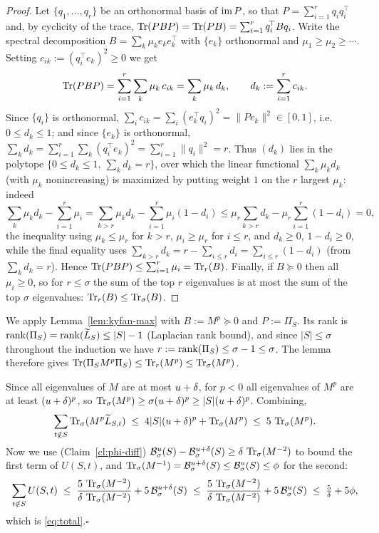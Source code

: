 \begin{proof}
Let $\{q_1,\dots,q_r\}$ be an orthonormal basis of $\operatorname{im} P$, so that
$P=\sum_{i=1}^r q_iq_i^{\!\top}$ and, by cyclicity of the trace,
$\operatorname{Tr}(PBP)=\operatorname{Tr}(PB)=\sum_{i=1}^{r}q_i^{\!\top}Bq_i$. Write the spectral
decomposition $B=\sum_{k}\mu_k e_ke_k^{\!\top}$ with $\{e_k\}$ orthonormal and
$\mu_1\ge\mu_2\ge\cdots$. Setting $c_{ik}:=(q_i^{\!\top}e_k)^2\ge0$ we get
\[
  \operatorname{Tr}(PBP)=\sum_{i=1}^{r}\sum_k \mu_k\,c_{ik}=\sum_k \mu_k\,d_k,
  \qquad d_k:=\sum_{i=1}^{r}c_{ik}.
\]
Since $\{q_i\}$ is orthonormal, $\sum_i c_{ik}=\sum_i(e_k^{\!\top}q_i)^2
=\|Pe_k\|^2\in[0,1]$, i.e. $0\le d_k\le1$; and since $\{e_k\}$ is orthonormal,
$\sum_k d_k=\sum_{i=1}^r\sum_k(q_i^{\!\top}e_k)^2=\sum_{i=1}^r\|q_i\|^2=r$.
Thus $(d_k)$ lies in the polytope $\{0\le d_k\le1,\ \sum_k d_k=r\}$, over which the
linear functional $\sum_k\mu_k d_k$ (with $\mu_k$ nonincreasing) is maximized by
putting weight $1$ on the $r$ largest $\mu_k$: indeed
\[
  \sum_k\mu_k d_k-\sum_{i=1}^{r}\mu_i
   =\sum_{k>r}\mu_k d_k-\sum_{i=1}^{r}\mu_i(1-d_i)
   \le\mu_r\sum_{k>r}d_k-\mu_r\sum_{i=1}^{r}(1-d_i)=0,
\]
the inequality using $\mu_k\le\mu_r$ for $k>r$, $\mu_i\ge\mu_r$ for $i\le r$, and
$d_k\ge0$, $1-d_i\ge0$, while the final equality uses
$\sum_{k>r}d_k=r-\sum_{i\le r}d_i=\sum_{i\le r}(1-d_i)$ (from $\sum_kd_k=r$).
Hence $\operatorname{Tr}(PBP)\le\sum_{i=1}^{r}\mu_i=\operatorname{Tr}_r(B)$. Finally, if $B\succeq0$ then
all $\mu_i\ge0$, so for $r\le\sigma$ the sum of the top $r$ eigenvalues is at most
the sum of the top $\sigma$ eigenvalues: $\operatorname{Tr}_r(B)\le\operatorname{Tr}_{\sigma}(B)$.
\end{proof}

We apply Lemma~\ref{lem:kyfan-max} with $B:=M^p\succeq0$ and $P:=\Pi_S$. Its rank is
$\operatorname{rank}(\Pi_S)=\operatorname{rank}(\widetilde{L}_S)\le |S|-1$ (Laplacian rank bound), and since
$|S|\le\sigma$ throughout the induction we have $r:=\operatorname{rank}(\Pi_S)\le\sigma-1\le\sigma$.
The lemma therefore gives
$\operatorname{Tr}(\Pi_S M^p\Pi_S)\le\operatorname{Tr}_{r}(M^p)\le\operatorname{Tr}_{\sigma}(M^p)$.

\smallskip
Since all eigenvalues of $M$ are at most $u+\delta$, for $p<0$ all eigenvalues of
$M^p$ are at least $(u+\delta)^p$, so $\operatorname{Tr}_{\sigma}(M^p)\ge\sigma(u+\delta)^p\ge|S|(u+\delta)^p$.
Combining,
\[
  \sum_{t\notin S}\operatorname{Tr}_{\sigma}(M^p\widetilde{L}_{S,t}) \;\le\; 4|S|(u+\delta)^p + \operatorname{Tr}_{\sigma}(M^p)
   \;\le\; 5\,\operatorname{Tr}_{\sigma}(M^p).
\]
Now we use (Claim~\ref{cl:phi-diff})
$\mathcal{B}^{u}_{\sigma}(S)-\mathcal{B}^{u+\delta}_{\sigma}(S)\ge\delta\,\operatorname{Tr}_{\sigma}(M^{-2})$ to bound the
first term of $U(S,t)$, and $\operatorname{Tr}_{\sigma}(M^{-1})=\mathcal{B}^{u+\delta}_{\sigma}(S)\le\mathcal{B}^{u}_{\sigma}(S)\le\phi$ for the
second:
\[
  \sum_{t\notin S}U(S,t)
   \;\le\; \frac{5\,\operatorname{Tr}_{\sigma}(M^{-2})}{\delta\,\operatorname{Tr}_{\sigma}(M^{-2})} + 5\,\mathcal{B}^{u+\delta}_{\sigma}(S)
   \;\le\; \frac{5\,\operatorname{Tr}_{\sigma}(M^{-2})}{\delta\,\operatorname{Tr}_{\sigma}(M^{-2})} + 5\,\mathcal{B}^{u}_{\sigma}(S)
   \;\le\; \tfrac{5}{\delta}+5\phi,
\]
which is \eqref{eq:total}.\hfill$\square$

